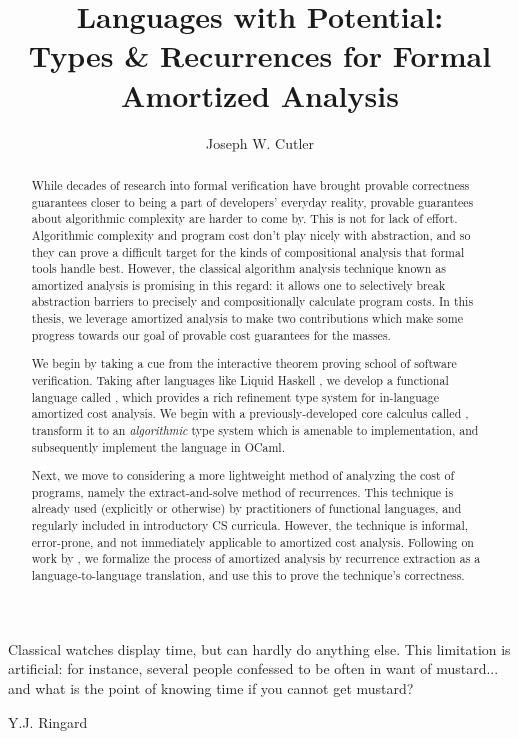\documentclass[final]{westhesis}
\title{Languages with Potential:\\
\normalsize{Types \& Recurrences for Formal Amortized Analysis}}
\author{Joseph W. Cutler}
\begin{document}
\begin{abstract}
While decades of research into formal verification have brought provable correctness guarantees closer to being a part of developers' everyday reality, provable guarantees about algorithmic complexity are harder to come by. This is not for lack of effort. Algorithmic complexity and program cost don't play nicely with abstraction, and so they can prove a difficult target for the kinds of compositional analysis that formal tools handle best. However, the classical algorithm analysis technique known as amortized analysis \cite{tarjan:amortized-complexity} is promising in this regard: it allows one to selectively break abstraction barriers to precisely and compositionally calculate program costs. In this thesis, we leverage amortized analysis to make two contributions which make some progress towards our goal of provable cost guarantees for the masses.

We begin by taking a cue from the interactive theorem proving school of software verification. Taking after languages like Liquid Haskell \cite{vazou-et-al:icfp14}, we develop a functional language called \lambdaamorimpl, which provides a rich refinement type system for in-language amortized cost analysis. We begin with a previously-developed core calculus called \lambdaamor \cite{rajani-et-al:popl21}, transform it to an \textit{algorithmic} type system which is amenable to implementation, and subsequently implement the language in OCaml.

Next, we move to considering a more lightweight method of analyzing the cost of programs, namely the extract-and-solve method of recurrences. This technique is already used (explicitly or otherwise) by practitioners of functional languages, and regularly included in introductory CS curricula. However, the technique is informal, error-prone, and not immediately applicable to amortized cost analysis. Following on work by \citet{danner-et-al:icfp15}, we formalize the process of amortized analysis by recurrence extraction as a language-to-language translation, and use this to prove the technique's correctness.
\end{abstract}


\begin{dedication}
\epigraph{Classical watches display time, but can hardly do anything else. This limitation is artificial: for instance, several people confessed to be often in want of mustard... and what is the point of knowing time if you cannot get mustard?}{Y.J. Ringard \cite{mustard-watches}}
\end{dedication}
\end{document}

